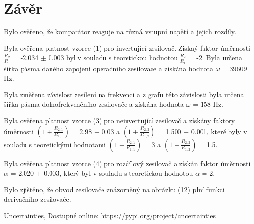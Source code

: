 \documentclass[a4paper,11pt]{article}
\begin{document}
        \section{Závěr} 
                \par Bylo ověřeno, že komparátor reaguje na různá vstupní napětí a jejich rozdíly.
                \par Byla ověřena platnost vzorce (1) pro invertující zesilovač. Ziskaý faktor úměrnosti $\frac{R_2}{R_1}$ = -2.034 $\pm$ 0.003 byl v souladu s teoretickou hodnotou $\frac{R_2}{R_1}$ = -2. Byla určena šířka pásma daného zapojení operačního zesilovače a získána hodnota $\omega$ = 39609 Hz.
                \par Byla změřena závislost zesílení na frekvenci a z grafu této závislosti byla určena šířka pásma dolnofrekvenčního zesilovače a získána hodnota $\omega$ = 158 Hz.
                \par  Byla ověřena platnost vzorce (3) pro neinvertující zesilovač a získány faktory úměrnosti $\left(1 + \frac{R_{2,1}}{R_{1,1}}\right)$ = 2.98 $\pm$ 0.03 a $\left(1 + \frac{R_{2,2}}{R_{1,2}}\right)$ = 1.500 $\pm$ 0.001, které byly v souladu s teoretickými hodnotami $\left(1 + \frac{R_{2,1}}{R_{1,1}}\right)$ = 3 a $\left(1 + \frac{R_{2,2}}{R_{1,2}}\right)$ = 1.5.
                \par  Byla ověřena platnost vzorce (4) pro rozdílový zesilovač a získán faktor úměrnosti $\alpha$ = 2.020 $\pm$ 0.003, který byl v souladu s teoretickou hodnotou $\alpha$ = 2.
                \par Bylo zjištěno, že obvod zesilovače znázorněný na obrázku (12) plní funkci derivačního zesilovače.

                \renewcommand{\refname}{Odkazy}
                \begin{thebibliography}{9}
                        Uncertainties, Dostupné online: \url{https://pypi.org/project/uncertainties}
                \end{thebibliography} 
\end{document}
